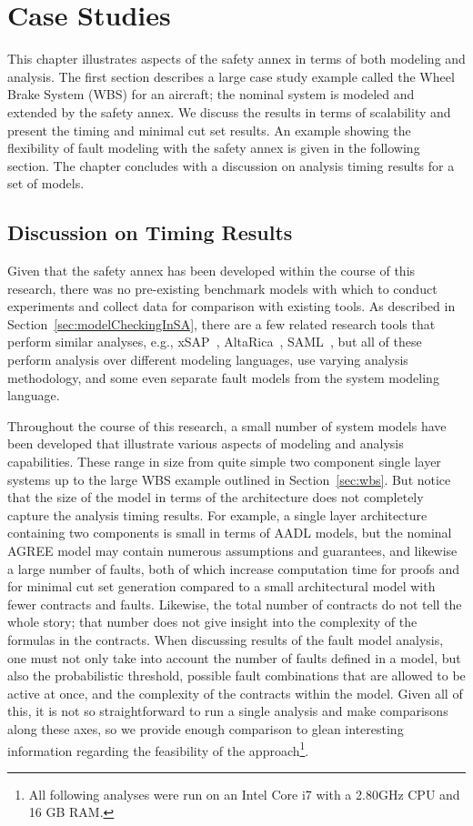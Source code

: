 \chapter{Case Studies}
\label{chap:caseStudies}
This chapter illustrates aspects of the safety annex in terms of both modeling and analysis. The first section describes a large case study example called the Wheel Brake System (WBS) for an aircraft; the nominal system is modeled and extended by the safety annex. We discuss the results in terms of scalability and present the timing and minimal cut set results. An example showing the flexibility of fault modeling with the safety annex is given in the following section. The chapter concludes with a discussion on analysis timing results for a set of models. 




\section{Discussion on Timing Results}
\label{sec:timing}
Given that the safety annex has been developed within the course of this research, there was no pre-existing benchmark models with which to conduct experiments and collect data for comparison with existing tools. As described in Section~\ref{sec:modelCheckingInSA}, there are a few related research tools that perform similar analyses, e.g., xSAP~\cite{DBLP:conf/tacas/BittnerBCCGGMMZ16}, AltaRica~\cite{signoret1998altarica}, SAML~\cite{Gudemann:2010:FQQ:1909626.1909813}, but all of these perform analysis over different modeling languages, use varying analysis methodology, and some even separate fault models from the system modeling language.

Throughout the course of this research, a small number of system models have been developed that illustrate various aspects of modeling and analysis capabilities. These range in size from quite simple two component single layer systems up to the large WBS example outlined in Section~\ref{sec:wbs}. But notice that the size of the model in terms of the architecture does not completely capture the analysis timing results. For example, a single layer architecture containing two components is small in terms of AADL models, but the nominal AGREE model may contain numerous assumptions and guarantees, and likewise a large number of faults, both of which increase computation time for proofs and for minimal cut set generation compared to a small architectural model with fewer contracts and faults. Likewise, the total number of contracts do not tell the whole story; that number does not give insight into the complexity of the formulas in the contracts. When discussing results of the fault model analysis, one must not only take into account the number of faults defined in a model, but also the probabilistic threshold, possible fault combinations that are allowed to be active at once, and the complexity of the contracts within the model. Given all of this, it is not so straightforward to run a single analysis and make comparisons along these axes, so we provide enough comparison to glean interesting information regarding the feasibility of the approach\footnote{All following analyses were run on an Intel Core i7 with a 2.80GHz CPU and 16 GB RAM. }.

